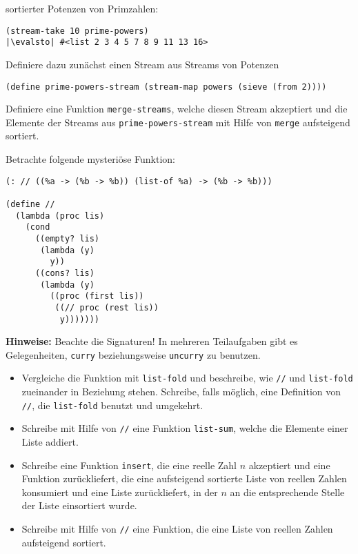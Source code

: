 \begin{aufgabe}
\begin{enumerate}
     sortierter Potenzen von Primzahlen:
     \begin{lstlisting}
(stream-take 10 prime-powers)
|\evalsto| #<list 2 3 4 5 7 8 9 11 13 16>
     \end{lstlisting}
     Definiere dazu zunächst einen Stream aus Streams von Potenzen
     \begin{lstlisting}
(define prime-powers-stream (stream-map powers (sieve (from 2))))
     \end{lstlisting}
     Definiere eine Funktion \lstinline{merge-streams}, welche
     diesen Stream akzeptiert und die Elemente der Streams
     aus \lstinline{prime-powers-stream} mit Hilfe von \lstinline{merge}
     aufsteigend sortiert.
   \end{enumerate}
 \end{aufgabe}

 \begin{aufgabe}
  Betrachte folgende mysteriöse Funktion:
\begin{lstlisting}
(: // ((%a -> (%b -> %b)) (list-of %a) -> (%b -> %b)))

(define //
  (lambda (proc lis)
    (cond
      ((empty? lis)
       (lambda (y)
         y))
      ((cons? lis)
       (lambda (y)
         ((proc (first lis))
          ((// proc (rest lis))
           y)))))))
\end{lstlisting}
  \textbf{Hinweise:} Beachte die Signaturen! In mehreren
  Teilaufgaben gibt es Gelegenheiten, \lstinline{curry} beziehungsweise
  \lstinline{uncurry} zu benutzen.

  \begin{itemize}
  \item Vergleiche die Funktion mit \lstinline{list-fold} und
    beschreibe, wie \lstinline{//} und \lstinline{list-fold} zueinander
    in Beziehung stehen.  Schreibe, falls möglich, eine
    Definition von \lstinline{//}, die \lstinline{list-fold} benutzt und
    umgekehrt.
  \item Schreibe mit Hilfe von \lstinline{//} eine Funktion
    \lstinline{list-sum}, welche die Elemente einer Liste addiert.
  \item Schreibe eine Funktion \lstinline{insert}, die eine reelle
    Zahl $n$ akzeptiert und eine Funktion zurückliefert, die eine
    aufsteigend sortierte Liste von reellen Zahlen konsumiert und
    eine Liste zurückliefert, in der $n$ an die entsprechende
    Stelle der Liste einsortiert wurde.
  \item Schreibe mit Hilfe von \lstinline{//} eine Funktion, die
    eine Liste von reellen Zahlen aufsteigend sortiert.
  \end{itemize}
\end{aufgabe}


